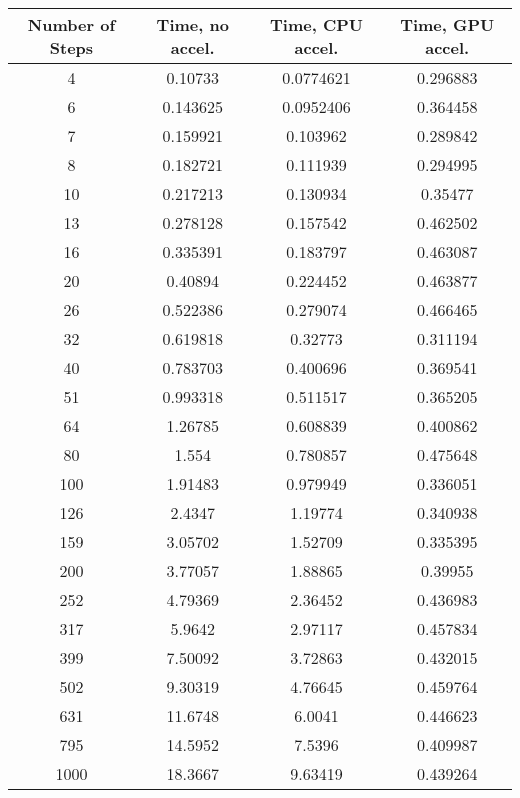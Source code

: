 \begin{table}[ht!]
    \centering
    {\footnotesize
        \begin{tabular}{| c | c c c |}
            \hline
            Number of Steps  & Time, no accel.  & Time, CPU accel. &  Time, GPU accel. \\
            \hline
            4 & 0.10733  & 0.0774621 & 0.296883 \\
            6 & 0.143625 & 0.0952406 & 0.364458 \\
            7 & 0.159921 & 0.103962  & 0.289842 \\
            8 & 0.182721 & 0.111939  & 0.294995 \\
            10 & 0.217213 & 0.130934  & 0.35477 \\
            13 & 0.278128 & 0.157542  & 0.462502 \\
            16 & 0.335391 & 0.183797  & 0.463087 \\ 
            20 & 0.40894  & 0.224452  & 0.463877 \\ 
            26 & 0.522386 & 0.279074  & 0.466465 \\
            32 & 0.619818 & 0.32773  & 0.311194 \\
            40 & 0.783703 & 0.400696 & 0.369541 \\
            51 & 0.993318 & 0.511517 & 0.365205 \\
            64 & 1.26785  & 0.608839 & 0.400862 \\
            80 & 1.554    & 0.780857 & 0.475648 \\
            100 & 1.91483  & 0.979949 & 0.336051 \\
            126 & 2.4347   & 1.19774  & 0.340938 \\
            159 & 3.05702  & 1.52709  & 0.335395 \\
            200 & 3.77057  & 1.88865  & 0.39955 \\
            252 & 4.79369  & 2.36452  & 0.436983 \\
            317 &  5.9642  &  2.97117 & 0.457834 \\
            399 &  7.50092 &  3.72863 & 0.432015 \\
            502 &  9.30319 &  4.76645 & 0.459764 \\ 
            631 & 11.6748  &  6.0041  & 0.446623 \\
            795 & 14.5952  &  7.5396  & 0.409987 \\ 
            1000 & 18.3667  &  9.63419 & 0.439264 \\

\end{tabular}}
\end{table}
